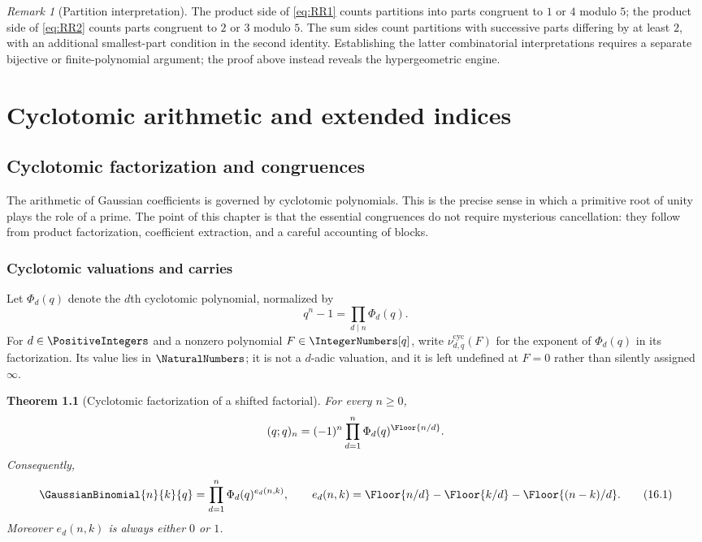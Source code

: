 \documentclass[11pt,a4paper,oneside,openany]{book}
\newtheorem{theorem}{Theorem}[chapter]
\theoremstyle{definition}
\theoremstyle{remark}
\newtheorem{remark}[remark]{Remark}
\newcommand{\CyclotomicValuation}[3]{\nu^{\mathrm{cyc}}_{#1,#2}\!\left(#3\right)}
\begin{document}
\begin{remark}[Partition interpretation]
The product side of \eqref{eq:RR1} counts partitions into parts congruent to $1$ or $4$ modulo $5$; the product side of \eqref{eq:RR2} counts parts congruent to $2$ or $3$ modulo $5$.  The sum sides count partitions with successive parts differing by at least $2$, with an additional smallest-part condition in the second identity.  Establishing the latter combinatorial interpretations requires a separate bijective or finite-polynomial argument; the proof above instead reveals the hypergeometric engine.
\end{remark}




\part{Cyclotomic arithmetic and extended indices}

\chapter{Cyclotomic factorization and congruences}\label{chap:cyclotomic}

The arithmetic of Gaussian coefficients is governed by cyclotomic polynomials.  This is the precise sense in which a primitive root of unity plays the role of a prime.  The point of this chapter is that the essential congruences do not require mysterious cancellation: they follow from product factorization, coefficient extraction, and a careful accounting of blocks.

\section{Cyclotomic valuations and carries}

Let $\Phi_d(q)$ denote the $d$th cyclotomic polynomial, normalized by
\[
 q^n-1=\prod_{d\mid n}\Phi_d(q).
\]
For $d\in\PositiveIntegers$ and a nonzero polynomial
$F\in\IntegerNumbers[q]$, write $\CyclotomicValuation{d}{q}{F}$ for the
exponent of $\Phi_d(q)$ in its factorization.  Its value lies in
$\NaturalNumbers$; it is not a $d$-adic valuation, and it is left undefined
at $F=0$ rather than silently assigned $\infty$.

\begin{theorem}[Cyclotomic factorization of a shifted factorial]\label{thm:cyclotomic-pochhammer}
For every $n\ge0$,
\[
 (q;q)_n=(-1)^n\prod_{d=1}^{n}\Phi_d(q)^{\Floor{n/d}}.
\]
Consequently,
\[
 \GaussianBinomial{n}{k}{q}
 =\prod_{d=1}^{n}\Phi_d(q)^{e_d(n,k)},
 \qquad
 e_d(n,k)=\Floor{n/d}-\Floor{k/d}-\Floor{(n-k)/d}.
 \tag{16.1}\label{eq:cyclotomic-gaussian}
\]
Moreover $e_d(n,k)$ is always either $0$ or $1$.
\end{theorem}
\end{document}
